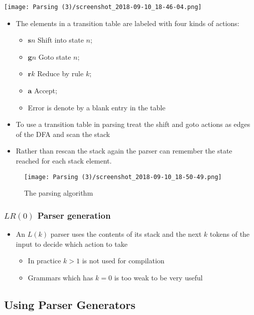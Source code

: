 \documentclass[11pt]{article}
\begin{document}
\begin{center}
\texttt{[image: Parsing (3)/screenshot\_2018-09-10\_18-46-04.png]}
\end{center}

\begin{itemize}
\item The elements in a transition table are labeled with four kinds of actions:
\begin{itemize}
\item \(\pmb sn\) Shift into state \(n\);
\item \(\pmb gn\) Goto state \(n\);
\item \(\pmb r k\) Reduce by rule \(k\);
\item \(\pmb a\) Accept;
\item Error is denote by a blank entry in the table
\end{itemize}

\item To use a transition table in parsing treat the shift and goto actions as edges of the DFA and scan the stack
\item Rather than rescan the stack again the parser can remember the state reached for each stack element.
\end{itemize}

\begin{figure}[htbp]
\centering
\texttt{[image: Parsing (3)/screenshot\_2018-09-10\_18-50-49.png]}
\caption{\label{fig:org570caee}
The parsing algorithm}
\end{figure}

\subsubsection{\(LR(0)\) Parser generation}
\label{sec:org0cdfae0}
\begin{itemize}
\item An \(L(k)\) parser uses the contents of its stack and the next \(k\) tokens of the input to decide which action to take
\begin{itemize}
\item In practice \(k>1\) is not used for compilation
\item Grammars which has \(k=0\) is too weak to be very useful
\end{itemize}
\end{itemize}

\subsection{Using Parser Generators}
\label{sec:orgaacb1fe}
\end{document}
